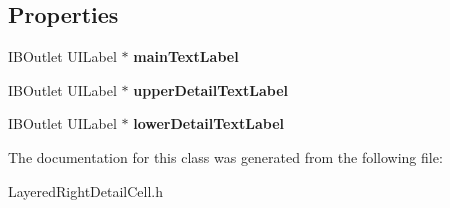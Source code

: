 \subsection*{Properties}
\begin{DoxyCompactItemize}
\item 
\hypertarget{interface_layered_right_detail_cell_aabc0589a423bde3b49a53a9d4be5277b}{I\-B\-Outlet U\-I\-Label $\ast$ {\bfseries main\-Text\-Label}}\label{interface_layered_right_detail_cell_aabc0589a423bde3b49a53a9d4be5277b}

\item 
\hypertarget{interface_layered_right_detail_cell_a640825f6998623ef2d1c17589daaf877}{I\-B\-Outlet U\-I\-Label $\ast$ {\bfseries upper\-Detail\-Text\-Label}}\label{interface_layered_right_detail_cell_a640825f6998623ef2d1c17589daaf877}

\item 
\hypertarget{interface_layered_right_detail_cell_a91a30bbf1dbe60d1871978b54daf8520}{I\-B\-Outlet U\-I\-Label $\ast$ {\bfseries lower\-Detail\-Text\-Label}}\label{interface_layered_right_detail_cell_a91a30bbf1dbe60d1871978b54daf8520}

\end{DoxyCompactItemize}


The documentation for this class was generated from the following file\-:\begin{DoxyCompactItemize}
\item 
Layered\-Right\-Detail\-Cell.\-h\end{DoxyCompactItemize}
